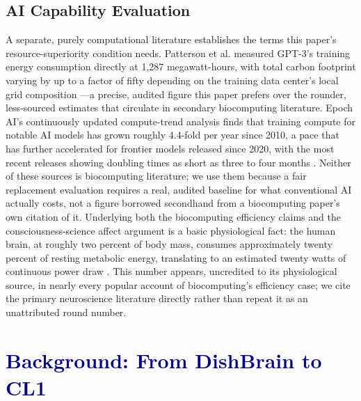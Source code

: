 \documentclass[journal]{IEEEtran}
\begin{document}
\subsection{\textcolor{ambercolor}{AI Capability Evaluation}}

A separate, purely computational literature establishes the terms this paper's
resource-superiority condition needs. Patterson et al. measured GPT-3's training
energy consumption directly at 1{,}287 megawatt-hours, with total carbon footprint
varying by up to a factor of fifty depending on the training data center's local
grid composition \cite{patterson2021carbon}---a precise, audited figure this paper
prefers over the rounder, less-sourced estimates that circulate in secondary
biocomputing literature. Epoch AI's continuously updated compute-trend analysis
finds that training compute for notable AI models has grown roughly 4.4-fold per
year since 2010, a pace that has further accelerated for frontier models released
since 2020, with the most recent releases showing doubling times as short as three
to four months \cite{epoch2025compute}. Neither of these sources is biocomputing
literature; we use them because a fair replacement evaluation requires a real,
audited baseline for what conventional AI actually costs, not a figure borrowed
secondhand from a biocomputing paper's own citation of it. Underlying both the
biocomputing efficiency claims and the consciousness-science affect argument is a
basic physiological fact: the human brain, at roughly two percent of body mass,
consumes approximately twenty percent of resting metabolic energy, translating to an
estimated twenty watts of continuous power draw \cite{raichle2002appraising,
attwell2001energy}. This number appears, uncredited to its physiological source, in
nearly every popular account of biocomputing's efficiency case; we cite the primary
neuroscience literature directly rather than repeat it as an unattributed round
number.

\section{\textcolor{darkblue}{Background: From DishBrain to CL1}}
\end{document}
